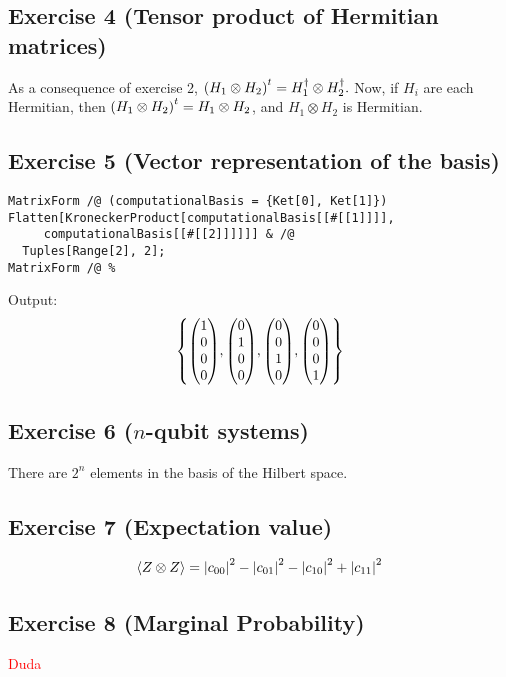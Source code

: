 \subsection{Exercise 4 (Tensor product of Hermitian matrices)}
As a consequence of exercise 2,
$\qty(H_1\otimes H_2)^t=H_1^{\dagger}\otimes H_2^{\dagger}.$
Now, if $H_i$ are each Hermitian, then $\qty(H_1\otimes H_2)^t
=H_1\otimes H_2$, and $H_1\otimes H_2$ is Hermitian.

\subsection{Exercise 5 (Vector representation of the basis)}
\begin{verbatim}
MatrixForm /@ (computationalBasis = {Ket[0], Ket[1]})
Flatten[KroneckerProduct[computationalBasis[[#[[1]]]], 
     computationalBasis[[#[[2]]]]]] & /@
  Tuples[Range[2], 2];
MatrixForm /@ %
\end{verbatim}
Output:
\begin{align}
\qty{\mqty(1\\0\\0\\0),\mqty(0\\1\\0\\0),\mqty(0\\0\\1\\0),\mqty(0\\0\\0\\1)}
\end{align}

\subsection{Exercise 6 ($n$-qubit systems)}\noindent
There are $2^n$ elements in the basis of the Hilbert space.

\subsection{Exercise 7 (Expectation value)}
\begin{align}
\expval{Z\otimes Z}=\abs{c_{00}}^2-\abs{c_{01}}^2-\abs{c_{10}}^2+\abs{c_{11}}^2
\end{align}

\subsection{Exercise 8 (Marginal Probability)}
\textcolor{red}{Duda}

